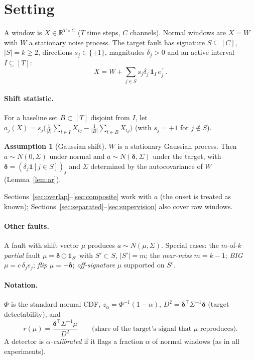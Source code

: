 \documentclass[11pt]{article}
\theoremstyle{definition}
\newtheorem{assumption}[theorem]{Assumption}
\theoremstyle{remark}
\newcommand{\R}{\mathbb{R}}
\newcommand{\1}{\mathbf{1}}
\begin{document}
\section{Setting}\label{sec:setting}
A window is $X\in\R^{T\times C}$ ($T$ time steps, $C$ channels). Normal windows are $X=W$ with $W$ a stationary noise process. The target fault has signature $S\subseteq[C]$, $|S|=k\ge 2$, directions $s_j\in\{\pm1\}$, magnitudes $\delta_j>0$ and an active interval $I\subseteq[T]$:
\[
X = W + \textstyle\sum_{j\in S} s_j\delta_j\,\1_I\, e_j^\top .
\]
\paragraph{Shift statistic.} For a baseline set $B\subset[T]$ disjoint from $I$, let
$a_j(X)=s_j\big(\tfrac{1}{|I|}\sum_{t\in I}X_{tj}-\tfrac{1}{|B|}\sum_{t\in B}X_{tj}\big)$ (with $s_j=+1$ for $j\notin S$).
\begin{assumption}[Gaussian shift]\label{ass:gauss}
$W$ is a stationary Gaussian process. Then $a\sim N(0,\Sigma)$ under normal and $a\sim N(\bm\delta,\Sigma)$ under the target, with $\bm\delta=(\delta_j\1[j\in S])_j$ and $\Sigma$ determined by the autocovariance of $W$ (Lemma~\ref{lem:ar}).
\end{assumption}
Sections~\ref{sec:overlap}--\ref{sec:composite} work with $a$ (the onset is treated as known); Sections~\ref{sec:separated}--\ref{sec:supervision} also cover raw windows.

\paragraph{Other faults.} A fault with shift vector $\mu$ produces $a\sim N(\mu,\Sigma)$. Special cases: the $m$-of-$k$ \emph{partial} fault $\mu=\bm\delta\odot\1_{S'}$ with $S'\subset S$, $|S'|=m$; the \emph{near-miss} $m=k-1$; \emph{BIG} $\mu=c\,\delta_je_j$; \emph{flip} $\mu=-\bm\delta$; \emph{off-signature} $\mu$ supported on $S^c$.

\paragraph{Notation.} $\Phi$ is the standard normal CDF, $z_\alpha=\Phi^{-1}(1-\alpha)$, $D^2=\bm\delta^\top\Sigma^{-1}\bm\delta$ (target detectability), and
\[
r(\mu)=\frac{\bm\delta^\top\Sigma^{-1}\mu}{D^2}\qquad\text{(share of the target's signal that $\mu$ reproduces).}
\]
A detector is \emph{$\alpha$-calibrated} if it flags a fraction $\alpha$ of normal windows (as in all experiments).
\end{document}
